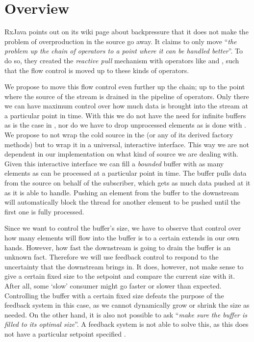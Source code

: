 \section{Overview}
\label{sec:buffer-control}
RxJava points out on its wiki page about backpressure \cite{RxJava-Wiki-Backpressure} that it does not make the problem of overproduction in the source go away. It claims to only move ``\textit{the problem up the chain of operators to a point where it can be handled better}''. To do so, they created the \textit{reactive pull} mechanism with operators like  and , such that the flow control is moved up to these kinds of operators.

We propose to move this flow control even further up the chain; up to the point where the source of the stream is drained in the pipeline of operators. Only there we can have maximum control over how much data is brought into the stream at a particular point in time. With this we do not have the need for infinite buffers as is the case in , nor do we have to drop unprocessed elements as is done with . We propose to not wrap the cold source in the  (or any of its derived factory methods) but to wrap it in a universal, interactive interface. This way we are not dependent in our implementation on what kind of source we are dealing with. Given this interactive interface we can fill a \textit{bounded} buffer with as many elements as can be processed at a particular point in time. The buffer pulls data from the source on behalf of the subscriber, which gets as much data pushed at it as it is able to handle. Pushing an element from the buffer to the downstream will automatically block the thread for another element to be pushed until the first one is fully processed.

Since we want to control the buffer's size, we have to observe that control over how many elements will flow into the buffer is to a certain extends in our own hands. However, how fast the downstream is going to drain the buffer is an unknown fact. Therefore we will use feedback control to respond to the uncertainty that the downstream brings in. It does, however, not make sense to give a certain fixed size to the setpoint and compare the current size with it. After all, some `slow' consumer might go faster or slower than expected. Controlling the buffer with a certain fixed size defeats the purpose of the feedback system in this case, as we cannot dynamically grow or shrink the size as needed. On the other hand, it is also not possible to ask ``\textit{make sure the buffer is filled to its optimal size}''. A feedback system is not able to solve this, as this does not have a particular setpoint specified \cite{janert2013-feedback}.

